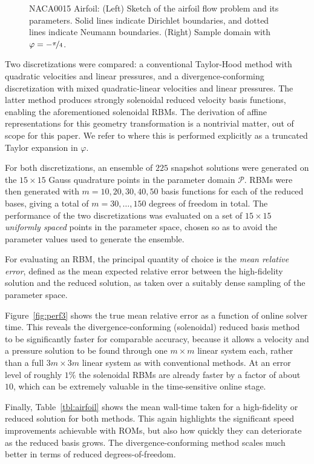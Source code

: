 \documentclass[a4paper]{jpconf}
\begin{document}
\begin{figure}
\begin{center}
  \end{center}
  \caption{
    NACA0015 Airfoil: (Left) Sketch of the airfoil flow problem and its parameters. Solid
    lines indicate Dirichlet boundaries, and dotted lines indicate Neumann
    boundaries. (Right) Sample domain with $\varphi = -\nicefrac{\pi}{4}$.
  }
  \label{fig:airfoil-sketch}
\end{figure}

Two discretizations were compared: a conventional Taylor-Hood method
with quadratic velocities and linear pressures, and a
divergence-conforming discretization with mixed quadratic-linear
velocities and linear pressures.  The latter method produces strongly
solenoidal reduced velocity basis functions, enabling the
aforementioned solenoidal RBMs. The derivation of affine
representations for this geometry transformation is a nontrivial
matter, out of scope for this paper.  We refer to \cite{Fonn2018fdc}
where this is performed explicitly as a truncated Taylor expansion in
$\varphi$.

For both discretizations, an ensemble of $225$ snapshot solutions were
generated on the $15 \times 15$ Gauss quadrature points in the
parameter domain $\mathcal{P}$.  RBMs were then generated with
$m = 10, 20, 30, 40, 50$ basis functions for each of the reduced
bases, giving a total of $m = 30, \ldots, 150$ degrees of freedom in
total. The performance of the two discretizations was evaluated on a
set of $15 \times 15$ \emph{uniformly spaced} points in the parameter
space, chosen so as to avoid the parameter values used to generate the
ensemble.

For evaluating an RBM, the principal quantity of choice is the
\emph{mean relative error}, defined as the mean expected relative
error between the high-fidelity solution and the reduced solution, as
taken over a suitably dense sampling of the parameter space.

Figure~\ref{fig:perf3} shows the true mean relative error as a
function of online solver time.  This reveals the
divergence-conforming (solenoidal) reduced basis method to be
significantly faster for comparable accuracy, because it allows a
velocity and a pressure solution to be found through one $m \times m$
linear system each, rather than a full $3m \times 3m$ linear system as
with conventional methods.  At an error level of roughly $1\%$ the
solenoidal RBMs are already faster by a factor of about $10$, which
can be extremely valuable in the time-sensitive online stage.

Finally, Table~\ref{tbl:airfoil} shows the mean wall-time taken for a
high-fidelity or reduced solution for both methods.  This again
highlights the significant speed improvements achievable with ROMs,
but also how quickly they can deteriorate as the reduced basis grows.
The divergence-conforming method scales much better in terms of
reduced degrees-of-freedom.
\end{document}
